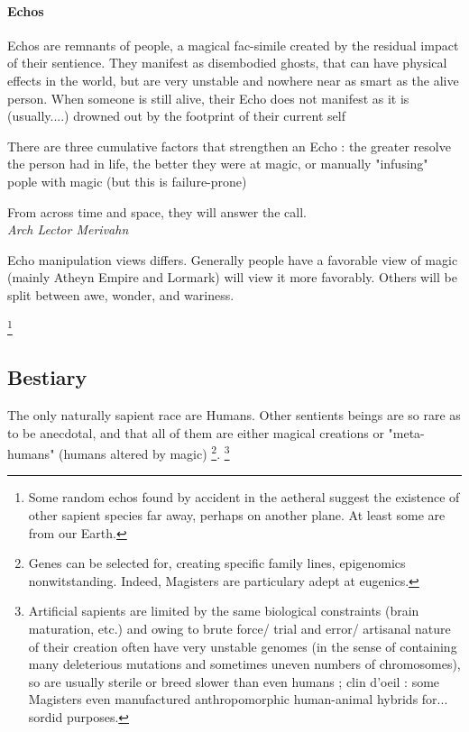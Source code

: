 \paragraph{Echos}

Echos are remnants of people, a magical fac-simile created by the residual impact of their sentience. They manifest as disembodied ghosts, that can have physical effects in the world,  but are very unstable and nowhere near as smart as the alive person. When someone is still alive, their Echo does not manifest as it is (usually....) drowned out by the footprint of their current self

There are three cumulative factors that strengthen an Echo : the greater resolve the person had in life,  the better they were at magic,  or manually "infusing" pople with magic (but this is failure-prone)

\begin{rpg-quotebox}
    From across time and space, they will answer the call. \\ \textendash \textit{Arch Lector Merivahn}
\end{rpg-quotebox}
        
Echo manipulation views differs. Generally people have a favorable view of magic (mainly Atheyn Empire and Lormark) will view it more favorably. Others will be split between awe, wonder, and wariness.

\footnote{Some random echos found by accident in the aetheral suggest the existence of other sapient species far away, perhaps on another plane. At least some are from our Earth.}


\subsection{Bestiary}



The only naturally sapient race are Humans. Other sentients beings are so rare as to be anecdotal, and that all of them are either magical creations or "meta-humans" (humans altered by magic)
\footnote{Genes can be selected for, creating specific family lines, epigenomics nonwitstanding. Indeed, Magisters are particulary adept at eugenics.}. \footnote{Artificial sapients are limited by the same biological constraints (brain maturation, etc.) and owing to brute force/ trial and error/ artisanal  nature of their creation often have very unstable genomes (in the sense of containing many deleterious mutations and sometimes uneven numbers of chromosomes), so are usually sterile or breed slower than even humans ; clin d'oeil : some Magisters even manufactured anthropomorphic human-animal hybrids for... sordid purposes.}

